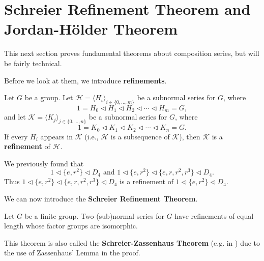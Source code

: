 \section{Schreier Refinement Theorem and Jordan-H\"older Theorem}
This next section proves fundamental theorems about composition series, but will be fairly technical.

Before we look at them, we introduce \textbf{refinements}.
\begin{definition}
    Let $G$ be a group. Let $\mathcal{H} = \langle H_i \rangle_{i\in\{0,\dots,m\}}$ be a subnormal series for $G$, where
    \[
        1 = H_0 \lhd H_1 \lhd H_2 \lhd \cdots \lhd H_m = G,
    \]
    and let $\mathcal{K} = \langle K_j \rangle_{j\in\{0,\dots,n\}}$ be a subnormal series for $G$, where
    \[
        1 = K_0 \lhd K_1 \lhd K_2 \lhd \cdots \lhd K_n = G.
    \]
    If every $H_i$ appears in $\mathcal{K}$ (i.e., $\mathcal{H}$ is a subsequence of $\mathcal{K}$), then $\mathcal{K}$ is a \textbf{refinement} of $\mathcal{H}$.
\end{definition}
\begin{example}
    We previously found that
    \[
        1 \lhd \{e, r^2\} \lhd D_4 \text{ and } 1 \lhd \{e, r^2\} \lhd \{e, r, r^2, r^3\} \lhd D_4.    
    \]
    Thus $1 \lhd \{e, r^2\} \lhd \{e, r, r^2, r^3\} \lhd D_4$ is a refinement of $1 \lhd \{e, r^2\} \lhd D_4$.
\end{example}

We can now introduce the \textbf{Schreier Refinement Theorem}.
\begin{theorem}\label{thrm-schreier}
    Let $G$ be a finite group. Two (sub)normal series for $G$ have refinements of equal length whose factor groups are isomorphic.
\end{theorem}
\begin{remark}
    This theorem is also called the \textbf{Schreier-Zassenhaus Theorem} (e.g. in \cite{clark_1984,proofwiki_schreierzassenhaus}) due to the use of Zassenhaus' Lemma in the proof.
\end{remark}

